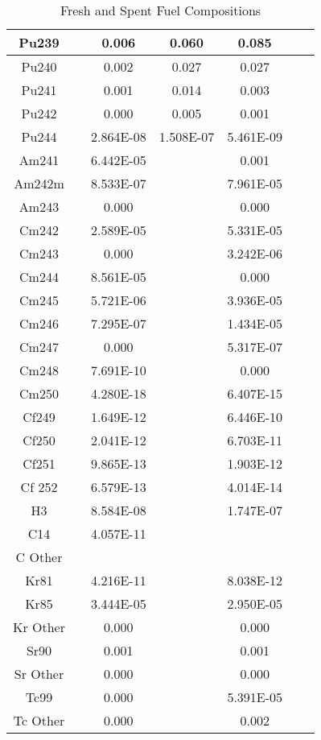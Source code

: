 \begin{table}[h]
{\begin{tabular}{|c|c|c|c|c|c|c|}
		 Pu239	 & 	 	& 	0.006 & 	0.060 & 	0.085 \\ \hline 
		 Pu240	 & 	 	& 	0.002 & 	0.027 & 	0.027 \\ \hline 
		 Pu241	 & 	 	& 	0.001 & 	0.014 & 	0.003 \\ \hline 
		 Pu242	 & 	 	& 	0.000 & 	0.005 & 	0.001 \\ \hline 
		 Pu244	 & 	 	& 	2.864E-08 & 1.508E-07 & 	5.461E-09 \\ \hline 
		 Am241	 & 	 	& 	6.442E-05 & 	 	 & 	0.001 \\ \hline 
		 Am242m	 & 	 	& 	8.533E-07 & 	 	 & 	7.961E-05 \\ \hline 
		 Am243	 & 	 	& 	0.000 & 	 	 & 	0.000 \\ \hline 
		 Cm242	 & 	 	& 	2.589E-05 & 	 	 & 	5.331E-05 \\ \hline 
		 Cm243	 & 	 	& 	0.000 & 	 	 & 	3.242E-06 \\ \hline 
		 Cm244	 & 	 	& 	8.561E-05 & 	 	 & 	0.000 \\ \hline 
		 Cm245	 & 	 	& 	5.721E-06 & 	 	 & 	3.936E-05 \\ \hline 
		 Cm246	 & 	 	& 	7.295E-07 & 	 	 & 	1.434E-05 \\ \hline 
		 Cm247	 & 	 	& 	0.000 & 	 	 & 	5.317E-07 \\ \hline 
		 Cm248	 & 	 	& 	7.691E-10 & 	 	 & 	0.000 \\ \hline 
		 Cm250	 & 	 	& 	4.280E-18 & 	 	 & 	6.407E-15 \\ \hline 
		 Cf249	 & 	 	& 	1.649E-12 & 	 	 & 	6.446E-10 \\ \hline 
		 Cf250	 & 	 	& 	2.041E-12 & 	 	 & 	6.703E-11 \\ \hline 
		 Cf251	 & 	 	& 	9.865E-13 & 	 	 & 	1.903E-12 \\ \hline 
		 Cf 252	 & 	 	& 	6.579E-13 & 	 	 & 	4.014E-14 \\ \hline 
		 H3	 & 	 	& 	8.584E-08 & 	 	 & 	1.747E-07 \\ \hline 
		 C14	 & 	 	& 	4.057E-11 & 	 	 & 	 	 \\ \hline 
		 C Other	 & 	 	& 	 	 & 	 	 & 	 	 \\ \hline 
		 Kr81	 & 	 	& 	4.216E-11 & 	 	 & 	8.038E-12 \\ \hline 
		 Kr85	 & 	 	& 	3.444E-05 & 	 	 & 	2.950E-05 \\ \hline 
		 Kr Other	 & 	 	& 	0.000 & 	 	 & 	0.000 \\ \hline 
		 Sr90	 & 	 	& 	0.001 & 	 	 & 	0.001 \\ \hline 
		 Sr Other	 & 	 	& 	0.000 & 	 	 & 	0.000 \\ \hline 
		 Tc99	 & 	 	& 	0.000 & 	 	 & 	5.391E-05 \\ \hline 
		 Tc Other	 & 	 	& 	0.000 & 	 	 & 	0.002 \\ \hline 

		\end{tabular}}
		\caption{Fresh and Spent Fuel Compositions}
		\label{tab:comp}
\end {table}
